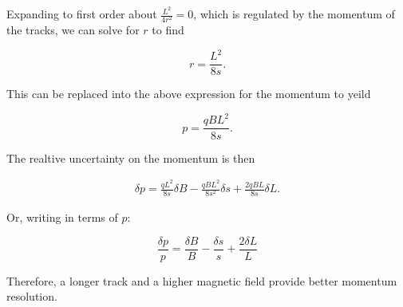   Expanding to first order about $\frac{L^2}{4r^2} = 0$, which is regulated by the momentum of the tracks, we can solve for $r$ to find

  \[
    r = \frac{L^2}{8s}.
  \]

  This can be replaced into the above expression for the momentum to yeild

  \[
    p=\frac{qBL^2}{8s}.
  \]

  The realtive uncertainty on the momentum is then

  \begin{align*}
    \delta p = \frac{q L^2}{8s} \delta B - \frac{qBL^2}{8s^2} \delta s + \frac{2qBL}{8s} \delta L.
  \end{align*}
  
  Or, writing in terms of $p$:

  \[
    \frac{\delta p}{p} = \frac{\delta B}{B} - \frac{\delta s}{s} + \frac{2 \delta L}{L} 
  \]

  Therefore, a longer track and a higher magnetic field provide better momentum resolution.

